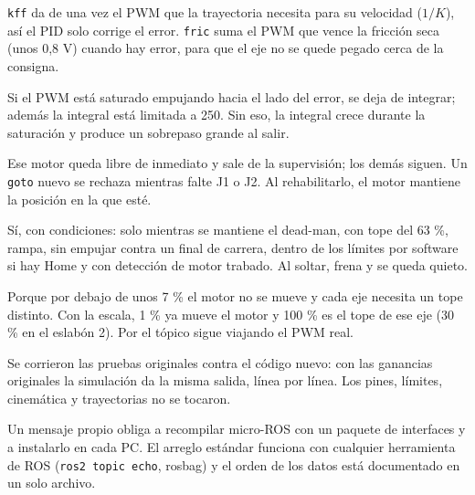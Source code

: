 \documentclass[11pt]{article}
\newcommand{\cod}[1]{\texttt{#1}}
\begin{document}
\begin{preg}
\cod{kff} da de una vez el PWM que la trayectoria necesita para su velocidad ($1/K$), así el PID solo corrige el error. \cod{fric} suma el PWM que vence la fricción seca (unos 0,8 V) cuando hay error, para que el eje no se quede pegado cerca de la consigna.
\end{preg}

\begin{preg}
Si el PWM está saturado empujando hacia el lado del error, se deja de integrar; además la integral está limitada a 250. Sin eso, la integral crece durante la saturación y produce un sobrepaso grande al salir.
\end{preg}

\begin{preg}
Ese motor queda libre de inmediato y sale de la supervisión; los demás siguen. Un \cod{goto} nuevo se rechaza mientras falte J1 o J2. Al rehabilitarlo, el motor mantiene la posición en la que esté.
\end{preg}

\begin{preg}
Sí, con condiciones: solo mientras se mantiene el dead-man, con tope del 63 \%, rampa, sin empujar contra un final de carrera, dentro de los límites por software si hay Home y con detección de motor trabado. Al soltar, frena y se queda quieto.
\end{preg}

\begin{preg}
Porque por debajo de unos 7 \% el motor no se mueve y cada eje necesita un tope distinto. Con la escala, 1 \% ya mueve el motor y 100 \% es el tope de ese eje (30 \% en el eslabón 2). Por el tópico sigue viajando el PWM real.
\end{preg}

\begin{preg}
Se corrieron las pruebas originales contra el código nuevo: con las ganancias originales la simulación da la misma salida, línea por línea. Los pines, límites, cinemática y trayectorias no se tocaron.
\end{preg}

\begin{preg}
Un mensaje propio obliga a recompilar micro-ROS con un paquete de interfaces y a instalarlo en cada PC. El arreglo estándar funciona con cualquier herramienta de ROS (\cod{ros2 topic echo}, rosbag) y el orden de los datos está documentado en un solo archivo.
\end{preg}
\end{document}
